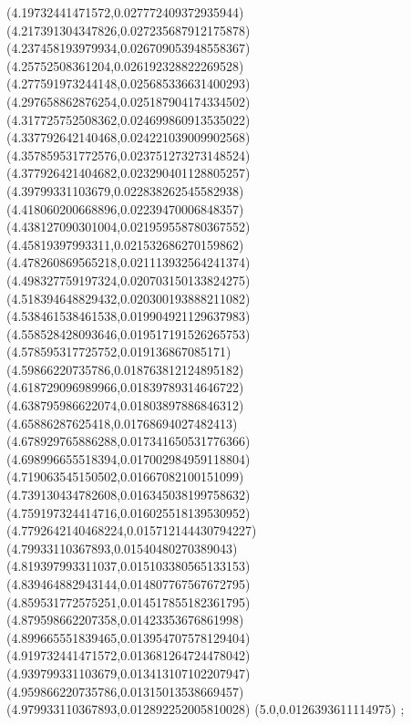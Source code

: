 {(4.19732441471572,0.027772409372935944)
(4.217391304347826,0.027235687912175878)
(4.237458193979934,0.026709053948558367)
(4.25752508361204,0.026192328822269528)
(4.277591973244148,0.025685336631400293)
(4.297658862876254,0.025187904174334502)
(4.317725752508362,0.024699860913535022)
(4.337792642140468,0.024221039009902568)
(4.357859531772576,0.023751273273148524)
(4.377926421404682,0.023290401128805257)
(4.39799331103679,0.022838262545582938)
(4.418060200668896,0.02239470006848357)
(4.438127090301004,0.021959558780367552)
(4.45819397993311,0.021532686270159862)
(4.478260869565218,0.021113932564241374)
(4.498327759197324,0.020703150133824275)
(4.518394648829432,0.020300193888211082)
(4.538461538461538,0.019904921129637983)
(4.558528428093646,0.019517191526265753)
(4.578595317725752,0.019136867085171)
(4.59866220735786,0.018763812124895182)
(4.618729096989966,0.01839789314646722)
(4.638795986622074,0.01803897886846312)
(4.65886287625418,0.01768694027482413)
(4.678929765886288,0.017341650531776366)
(4.698996655518394,0.017002984959118804)
(4.719063545150502,0.01667082100151099)
(4.739130434782608,0.016345038199758632)
(4.759197324414716,0.016025518139530952)
(4.7792642140468224,0.015712144430794227)
(4.79933110367893,0.01540480270389043)
(4.819397993311037,0.015103380565133153)
(4.839464882943144,0.014807767567672795)
(4.859531772575251,0.014517855182361795)
(4.879598662207358,0.01423353676861998)
(4.899665551839465,0.013954707578129404)
(4.919732441471572,0.013681264724478042)
(4.939799331103679,0.013413107102207947)
(4.959866220735786,0.01315013538669457)
(4.979933110367893,0.012892252005810028)
(5.0,0.0126393611114975)
};
